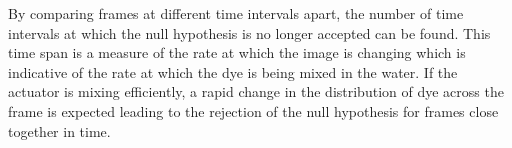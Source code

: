 By comparing frames at different time intervals apart, the number of time intervals at which the null hypothesis is no longer accepted can be found. This time span is a measure of the rate at which the image is changing which is indicative of the rate at which the dye is being mixed in the water. If the actuator is mixing efficiently, a rapid change in the distribution of dye across the frame is expected leading to the rejection of the null hypothesis for frames close together in time.



\begin{figure}[H]
     \label{fig:ttest}


\end{figure}

